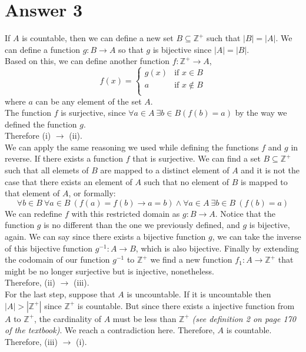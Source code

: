 \documentclass[11pt]{article}
\begin{document}
\section*{Answer 3}
		If $A$ is countable, then we can define a new set $B \subseteq \mathbb{Z^+}$ such that $|B| = |A|$. We can define a function $g:B \rightarrow A$ so that $g$ is bijective since $|A| = |B|$.\\ 
		Based on this, we can define another function $f:\mathbb{Z^+} \rightarrow A$, 
		\begin{equation*}
			f(x) = \begin{cases}
				g(x) & \text{if $x \in B$}\\
				a & \text{if $x \notin B$}\\
			\end{cases}
		\end{equation*}
		where $a$ can be any element of the set $A$.\\
		The function $f$ is surjective, since $\forall a\in A\ \exists b\in B(f(b) = a)$ by the way we defined the function $g$.\\
		Therefore (i) $\rightarrow$ (ii).\\


		We can apply the same reasoning we used while defining the functions $f$ and $g$ in reverse. If there exists a function $f$ that is surjective. We can find a set $B \subseteq \mathbb{Z^+}$ such that all elemets of $B$ are mapped to a distinct element of $A$ and it is not the case that there exists an element of $A$ such that no element of $B$ is mapped to that element of $A$, or formally:
		\[ \forall b\in B\ \forall a\in B\ (f(a) = f(b) \rightarrow a = b) \land \forall a\in A\ \exists b\in B\ (f(b)=a)\]
		We can redefine $f$ with this restricted domain as $g: B \rightarrow A$. Notice that the function $g$ is no different than the one we previously defined, and $g$ is bijective, again. We can say since there exists a bijective function $g$, we can take the inverse of this bijective function $g^{-1}:A \rightarrow B$, which is also bijective. Finally by extending the codomain of our function $g^{-1}$ to $\mathbb{Z^+}$ we find a new function $f_1:A \rightarrow\mathbb{Z^+}$ that might be no longer surjective but is injective, nonetheless.\\
		Therefore, (ii) $\rightarrow$ (iii).\\
		
		For the last step, suppose that $A$ is uncountable. If it is uncountable then $|A| > |\mathbb{Z^+}|$ since $\mathbb{Z^+}$ is countable. But since there exists a injective function from $A$ to $\mathbb{Z^+}$, the cardinality of $A$ must be less than $\mathbb{Z^+}$ \textit{(see definition 2 on page 170 of the textbook)}. We reach a contradiction here. Therefore, $A$ is countable.
		Therefore, (iii) $\rightarrow$ (i).\\
\end{document}
